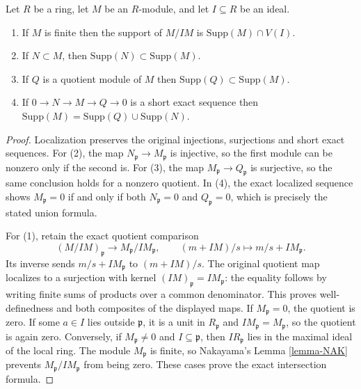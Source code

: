\begin{lemma}
\label{lemma-support-quotient}
Let $R$ be a ring, let $M$ be an $R$-module, and let $I\subseteq R$ be an ideal.
\begin{enumerate}
\item If $M$ is finite then the support
of $M/IM$ is $\text{Supp}(M) \cap V(I)$.
\item If $N \subset M$, then $\text{Supp}(N) \subset
\text{Supp}(M)$.
\item If $Q$ is a quotient module of $M$ then $\text{Supp}(Q) \subset
\text{Supp}(M)$.
\item If $0 \to N \to M \to Q \to 0$ is a short exact sequence
then $\text{Supp}(M) = \text{Supp}(Q) \cup \text{Supp}(N)$.
\end{enumerate}
\end{lemma}

\begin{proof}
Localization preserves the original injections, surjections
and short exact sequences. For (2), the map
$N_{\mathfrak p}\to M_{\mathfrak p}$ is injective, so
the first module can be nonzero only if the second is.
For (3), the map $M_{\mathfrak p}\to Q_{\mathfrak p}$
is surjective, so the same conclusion holds for a nonzero
quotient. In (4), the exact localized sequence shows
$M_{\mathfrak p}=0$ if and only if both
$N_{\mathfrak p}=0$ and $Q_{\mathfrak p}=0$, which is
precisely the stated union formula.

For (1), retain the exact quotient comparison
$$
(M/IM)_{\mathfrak p}\longrightarrow M_{\mathfrak p}/IM_{\mathfrak p},
\qquad (m+IM)/s\longmapsto m/s+IM_{\mathfrak p}.
$$
Its inverse sends $m/s+IM_{\mathfrak p}$ to $(m+IM)/s$.
The original quotient map localizes to a surjection with
kernel $(IM)_{\mathfrak p}=IM_{\mathfrak p}$: the equality
follows by writing finite sums of products over a common
denominator. This proves well-definedness and both
composites of the displayed maps. If $M_{\mathfrak p}=0$,
the quotient is zero. If some $a\in I$ lies outside
$\mathfrak p$, it is a unit in $R_{\mathfrak p}$ and
$IM_{\mathfrak p}=M_{\mathfrak p}$, so the quotient is
again zero. Conversely, if $M_{\mathfrak p}\ne0$ and
$I\subseteq\mathfrak p$, then $IR_{\mathfrak p}$ lies
in the maximal ideal of the local ring. The module
$M_{\mathfrak p}$ is finite, so Nakayama's
Lemma \ref{lemma-NAK} prevents
$M_{\mathfrak p}/IM_{\mathfrak p}$ from being zero.
These cases prove the exact intersection formula.
\end{proof}